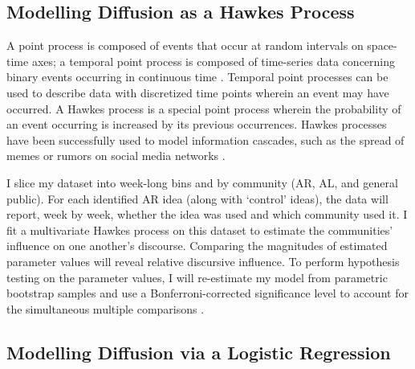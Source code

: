 \documentclass[acmlarge, screen, authorversion]{acmart}
\begin{document}
\subsection{Modelling Diffusion as a Hawkes Process}

A point process is composed of events that occur at random intervals on
space-time axes; a temporal point process is composed of time-series data
concerning binary events occurring in continuous time
\cite{daleyIntroductionTheoryPoint2003, ogataSpaceTimePointProcessModels1998}.
Temporal point processes can be used to describe data with discretized time
points wherein an event may have occurred. A Hawkes process is a special point
process wherein the probability of an event occurring is increased by its
previous occurrences. Hawkes processes have been successfully used to model
information cascades, such as the spread of memes or rumors on social media
networks
\cite{luoMultiTaskMultiDimensionalHawkes2015,lukasikHawkesProcessesContinuous2016}.

I slice my dataset into week-long bins and by community (AR, AL, and general
public). For each identified AR idea (along with  `control' ideas), the data
will report, week by week, whether the idea was used and which community used
it. I fit a multivariate Hawkes process on this dataset to estimate the
communities' influence on one another's discourse. Comparing the magnitudes of
estimated parameter values will reveal relative discursive influence. To perform
hypothesis testing on the parameter values, I will re-estimate my model from
parametric bootstrap samples \cite{reinhartReviewSelfExcitingSpatioTemporal2018}
and use a Bonferroni-corrected significance level to account for the
simultaneous multiple comparisons \cite{tanEffectWordingMessage2014}.

%

\subsection{Modelling Diffusion via a Logistic Regression}
\end{document}
